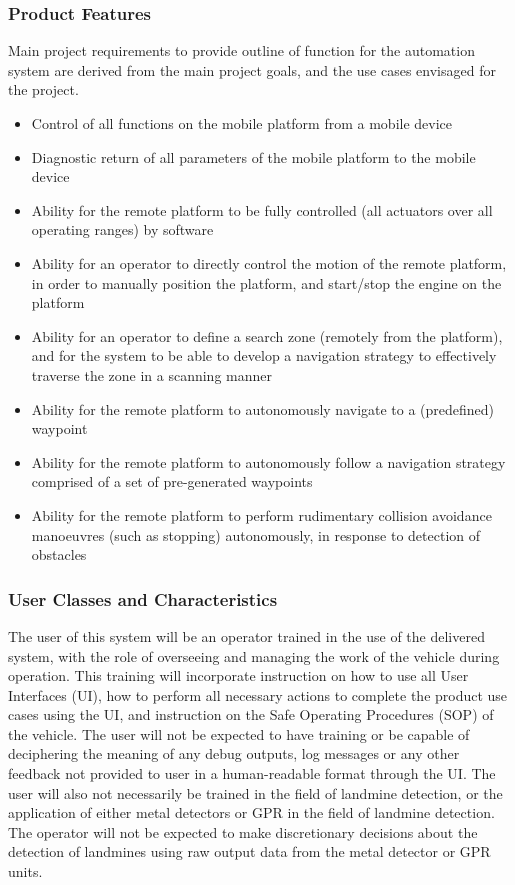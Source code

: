 \documentclass[main.tex]{subfiles}
\begin{document}
\begin{appendices}
\subsubsection{Product Features}
Main project requirements to provide outline of function for the automation system are derived from the main project goals, and the use cases envisaged for the project.
\begin{itemize}
\item Control of all functions on the mobile platform from a mobile device
\item Diagnostic return of all parameters of the mobile platform to the mobile device
\item Ability for the remote platform to be fully controlled (all actuators over all operating ranges) by software
\item Ability for an operator to directly control the motion of the remote platform, in order to manually position the platform, and start/stop the engine on the platform
\item Ability for an operator to define a search zone (remotely from the platform), and for the system to be able to develop a navigation strategy to effectively traverse the zone in a scanning manner
\item Ability for the remote platform to autonomously navigate to a (predefined) waypoint
\item Ability for the remote platform to autonomously follow a navigation strategy comprised of a set of pre-generated waypoints
\item Ability for the remote platform to perform rudimentary collision avoidance manoeuvres (such as stopping) autonomously, in response to detection of obstacles
\end{itemize}
 
\subsubsection{User Classes and Characteristics}
The user of this system will be an operator trained in the use of the delivered system, with the role of overseeing and managing the work of the vehicle during operation. 
This training will incorporate instruction on how to use all User Interfaces (UI), how to perform all necessary actions to complete the product use cases using the UI, and instruction on the Safe Operating Procedures (SOP) of the vehicle. 
The user will not be expected to have training or be capable of deciphering the meaning of any debug outputs, log messages or any other feedback not provided to user in a human-readable format through the UI.
The user will also not necessarily be trained in the field of landmine detection, or the application of either metal detectors or GPR in the field of landmine detection. 
The operator will not be expected to make discretionary decisions about the detection of landmines using raw output data from the metal detector or GPR units.

\end{appendices}
\end{document}
